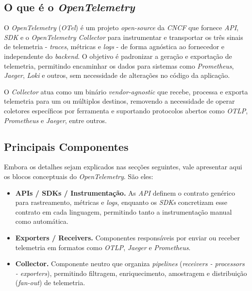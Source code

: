 \subsection{O que é o \textit{OpenTelemetry}}

O \textit{OpenTelemetry} (\textit{OTel}) é um projeto \textit{open-source} da \textit{CNCF} que fornece \textit{API}, \textit{SDK} e o \textit{OpenTelemetry Collector} para instrumentar e transportar os três sinais de telemetria - \textit{traces}, métricas e \textit{logs} - de forma agnóstica ao fornecedor e independente do \textit{backend}. O objetivo é padronizar a geração e exportação de telemetria, permitindo encaminhar os dados para sistemas como \textit{Prometheus}, \textit{Jaeger}, \textit{Loki} e outros, sem necessidade de alterações no código da aplicação.

O \textit{Collector} atua como um binário \textit{vendor-agnostic} que recebe, processa e exporta telemetria para um ou múltiplos destinos, removendo a necessidade de operar coletores específicos por ferramenta e suportando protocolos abertos como \textit{OTLP}, \textit{Prometheus} e \textit{Jaeger}, entre outros.


\subsection{Principais Componentes}

Embora os detalhes sejam explicados nas secções seguintes, vale apresentar aqui os blocos conceptuais do \textit{OpenTelemetry}. São eles:

\begin{itemize}
    \item \textbf{APIs / SDKs / Instrumentação.} As \textit{API} definem o contrato genérico para rastreamento, métricas e \textit{logs}, enquanto os \textit{SDKs} concretizam esse contrato em cada linguagem, permitindo tanto a instrumentação manual como automática.
    
    \item \textbf{Exporters / Receivers.} Componentes responsáveis por enviar ou receber telemetria em formatos como \textit{OTLP}, \textit{Jaeger} e \textit{Prometheus}.
    
    \item \textbf{Collector.} Componente neutro que organiza \textit{pipelines} (\textit{receivers - processors - exporters}), permitindo filtragem, enriquecimento, amostragem e distribuição (\textit{fan-out}) de telemetria.
\end{itemize}


